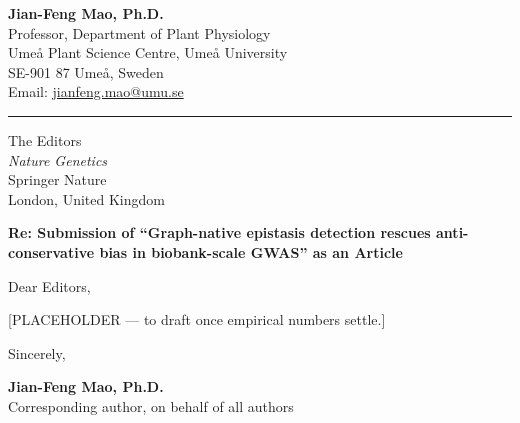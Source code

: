 \documentclass[11pt,a4paper]{article}
\begin{document}
\textbf{Jian-Feng Mao, Ph.D.}\\
Professor, Department of Plant Physiology\\
Ume\aa{} Plant Science Centre, Ume\aa{} University\\
SE-901 87 Ume\aa{}, Sweden\\
Email: \href{mailto:jianfeng.mao@umu.se}{jianfeng.mao@umu.se}

\vspace{0.3em}
\noindent\rule{\textwidth}{0.4pt}

\begin{flushright}
\end{flushright}

\vspace{0.2em}

The Editors\\
\textit{Nature Genetics}\\
Springer Nature\\
London, United Kingdom

\vspace{0.5em}

\textbf{Re: Submission of ``Graph-native epistasis detection rescues anti-conservative bias in biobank-scale GWAS'' as an Article}

\vspace{0.3em}

Dear Editors,

[PLACEHOLDER --- to draft once empirical numbers settle.]

\vspace{0.3em}

Sincerely,

\vspace{1.4em}

\textbf{Jian-Feng Mao, Ph.D.}\\
Corresponding author, on behalf of all authors\\
\end{document}
